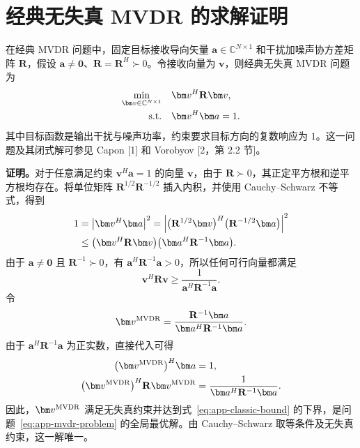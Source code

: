 \appendix
\section{经典无失真 MVDR 的求解证明}\label{app:classic}
在经典 MVDR 问题中，固定目标接收导向矢量 $\bm a\in\mathbb C^{N\times1}$ 和干扰加噪声协方差矩阵 $\mathbf R$，假设 $\bm a\ne\bm0$、$\mathbf R=\mathbf R^H\succ0$。令接收向量为 $\bm v$，则经典无失真 MVDR 问题为
\begin{align}\label{eq:app-mvdr-problem}
\min_{\bm v\in\mathbb C^{N\times1}}\quad
&\bm v^H\mathbf R\bm v,\\
\text{s.t.}\quad &\bm v^H\bm a=1.\notag
\end{align}
其中目标函数是输出干扰与噪声功率，约束要求目标方向的复数响应为 $1$。这一问题及其闭式解可参见 Capon [1] 和 Vorobyov [2，第 2.2 节]。

\noindent\textbf{证明。}对于任意满足约束 $\bm v^H\bm a=1$ 的向量 $\bm v$，由于 $\mathbf R\succ0$，其正定平方根和逆平方根均存在。将单位矩阵 $\mathbf R^{1/2}\mathbf R^{-1/2}$ 插入内积，并使用 Cauchy--Schwarz 不等式，得到
\begin{align}\label{eq:app-classic-cs}
1&=\left|\bm v^H\bm a\right|^2
=\left|\bigl(\mathbf R^{1/2}\bm v\bigr)^H
\bigl(\mathbf R^{-1/2}\bm a\bigr)\right|^2\notag\\
&\le\bigl(\bm v^H\mathbf R\bm v\bigr)
\bigl(\bm a^H\mathbf R^{-1}\bm a\bigr).
\end{align}
由于 $\bm a\ne\bm0$ 且 $\mathbf R^{-1}\succ0$，有 $\bm a^H\mathbf R^{-1}\bm a>0$，所以任何可行向量都满足
\begin{equation}\label{eq:app-classic-bound}
\bm v^H\mathbf R\bm v\ge
\frac{1}{\bm a^H\mathbf R^{-1}\bm a}.
\end{equation}
令
\begin{equation}\label{eq:app-classic-solution}
\bm v^{\rm MVDR}=
\frac{\mathbf R^{-1}\bm a}{\bm a^H\mathbf R^{-1}\bm a}.
\end{equation}
由于 $\bm a^H\mathbf R^{-1}\bm a$ 为正实数，直接代入可得
\begin{align}\label{eq:app-classic-check}
\bigl(\bm v^{\rm MVDR}\bigr)^H\bm a&=1,\\
\bigl(\bm v^{\rm MVDR}\bigr)^H\mathbf R\bm v^{\rm MVDR}
&=\frac{1}{\bm a^H\mathbf R^{-1}\bm a}.\notag
\end{align}
因此，$\bm v^{\rm MVDR}$ 满足无失真约束并达到式~\eqref{eq:app-classic-bound} 的下界，是问题~\eqref{eq:app-mvdr-problem} 的全局最优解。由 Cauchy--Schwarz 取等条件及无失真约束，这一解唯一。

